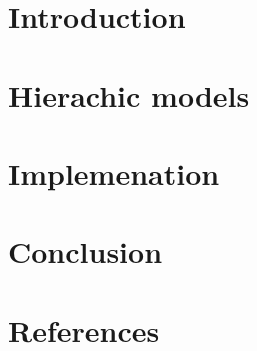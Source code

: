 \documentclass[final, paper=letter,5p,times,twocolumn]{elsarticle}
\theoremstyle{definition}
\begin{document}
\section{Introduction}



\section{Hierachic models}



\section{Implemenation}




\section{Conclusion}

\section*{References}



\end{document}
